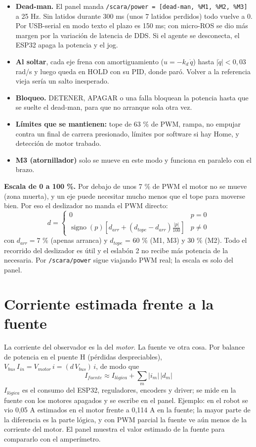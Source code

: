 \documentclass[11pt]{article}
\newcommand{\cod}[1]{\texttt{#1}}
\begin{document}
\begin{itemize}
  \item \textbf{Dead-man.} El panel manda \cod{/scara/power = [dead-man, \%M1, \%M2, \%M3]} a 25 Hz. Sin latidos durante 300 ms (unos 7 latidos perdidos) todo vuelve a 0. Por USB-serial en modo texto el plazo es 150 ms; con micro-ROS se dio más margen por la variación de latencia de DDS. Si el agente se desconecta, el ESP32 apaga la potencia y el jog.
  \item \textbf{Al soltar}, cada eje frena con amortiguamiento ($u=-k_d\,\dot q$) hasta $|\dot q|<0{,}03$ rad/s y luego queda en HOLD con su PID, donde paró. Volver a la referencia vieja sería un salto inesperado.
  \item \textbf{Bloqueo.} DETENER, APAGAR o una falla bloquean la potencia hasta que se suelte el dead-man, para que no arranque sola otra vez.
  \item \textbf{Límites que se mantienen:} tope de 63 \% de PWM, rampa, no empujar contra un final de carrera presionado, límites por software si hay Home, y detección de motor trabado.
  \item \textbf{M3 (atornillador)} solo se mueve en este modo y funciona en paralelo con el brazo.
\end{itemize}

\textbf{Escala de 0 a 100 \%.} Por debajo de unos 7 \% de PWM el motor no se mueve (zona muerta), y un eje puede necesitar mucho menos que el tope para moverse bien. Por eso el deslizador no manda el PWM directo:
\begin{equation}
d=\begin{cases}0 & p=0\\ \operatorname{signo}(p)\left[d_{arr}+(d_{tope}-d_{arr})\frac{|p|}{100}\right] & p\neq0\end{cases}
\end{equation}
con $d_{arr}=7$ \% (apenas arranca) y $d_{tope}$ = 60 \% (M1, M3) y 30 \% (M2). Todo el recorrido del deslizador es útil y el eslabón 2 no recibe más potencia de la necesaria. Por \cod{/scara/power} sigue viajando PWM real; la escala es solo del panel.

\section{Corriente estimada frente a la fuente}

La corriente del observador es la del \emph{motor}. La fuente ve otra cosa. Por balance de potencia en el puente H (pérdidas despreciables), $V_{bus}\,I_{in}=V_{motor}\,i=(d\,V_{bus})\,i$, de modo que
\begin{equation}
I_{fuente}\approx I_{lógica}+\sum_m |i_m|\,|d_m|
\end{equation}
$I_{lógica}$ es el consumo del ESP32, reguladores, encoders y driver; se mide en la fuente con los motores apagados y se escribe en el panel. Ejemplo: en el robot se vio 0,05 A estimados en el motor frente a 0,114 A en la fuente; la mayor parte de la diferencia es la parte lógica, y con PWM parcial la fuente ve aún menos de la corriente del motor. El panel muestra el valor estimado de la fuente para compararlo con el amperímetro.
\end{document}
